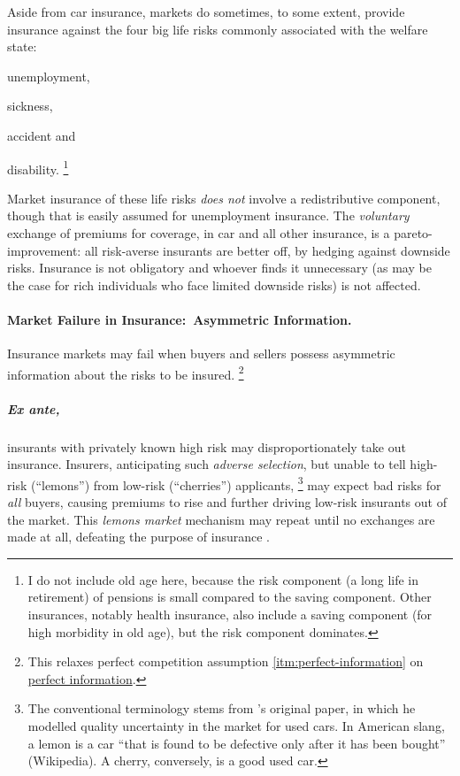 Aside from car insurance, markets do sometimes, to some extent, provide insurance against the four big life risks commonly associated with the welfare state:
\begin{inparaenum}[1)]
	\item unemployment,
	\item sickness,
	\item accident and
	\item disability.
	\footnote{
		I do not include old age here, because the risk component (a long life in retirement) of pensions is small compared to the saving component.
		Other insurances, notably health insurance, also include a saving component (for high morbidity in old age), but the risk component dominates.
	}
\end{inparaenum}

Market insurance of these life risks \emph{does not} involve a redistributive component, though that is easily assumed for unemployment insurance.
The \emph{voluntary} exchange of premiums for coverage, in car and all other insurance, is a pareto-improvement:
all risk-averse insurants are better off, by hedging against downside risks.
Insurance is not obligatory and whoever finds it unnecessary (as may be the case for rich individuals who face limited downside risks) is not affected.

\paragraph{Market Failure in Insurance:\ Asymmetric Information.}
\label{sec:asymmetric-information}

Insurance markets may fail when buyers and sellers possess asymmetric information about the risks to be insured.
\footnote{
	This relaxes perfect competition assumption \ref{itm:perfect-information} on \hyperref[itm:perfect-information]{perfect information}.
}

\subparagraph[Adverse Selection]{Ex ante,} \label{sec:adverse-selection} insurants with privately known high risk may disproportionately take out insurance.
Insurers, anticipating such \emph{adverse selection}, but unable to tell high-risk (``lemons'') from low-risk (``cherries'') applicants,
\footnote{
	The conventional terminology stems from \citeauthor{Akerlof-1970-aa}'s original paper, in which he modelled quality uncertainty in the market for used cars.
	In American slang, a lemon is a car ``that is found to be defective only after it has been bought'' (Wikipedia).
	A cherry, conversely, is a good used car.
}
may expect bad risks for \emph{all} buyers, causing premiums to rise and further driving low-risk insurants out of the market.
This \emph{lemons market} mechanism may repeat until no exchanges are made at all, defeating the purpose of insurance \citep{Akerlof-1970-aa}.

